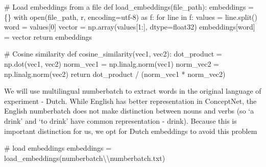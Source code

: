 \documentclass[
  letterpaper,
  DIV=11,
  numbers=noendperiod]{scrreprt}
\newenvironment{Shaded}{\begin{snugshade}}{\end{snugshade}}
\newcommand{\BuiltInTok}[1]{\textcolor[rgb]{0.00,0.23,0.31}{#1}}
\newcommand{\CharTok}[1]{\textcolor[rgb]{0.13,0.47,0.30}{#1}}
\newcommand{\CommentTok}[1]{\textcolor[rgb]{0.37,0.37,0.37}{#1}}
\newcommand{\ControlFlowTok}[1]{\textcolor[rgb]{0.00,0.23,0.31}{#1}}
\newcommand{\DecValTok}[1]{\textcolor[rgb]{0.68,0.00,0.00}{#1}}
\newcommand{\ImportTok}[1]{\textcolor[rgb]{0.00,0.46,0.62}{#1}}
\newcommand{\KeywordTok}[1]{\textcolor[rgb]{0.00,0.23,0.31}{#1}}
\newcommand{\NormalTok}[1]{\textcolor[rgb]{0.00,0.23,0.31}{#1}}
\newcommand{\OperatorTok}[1]{\textcolor[rgb]{0.37,0.37,0.37}{#1}}
\newcommand{\StringTok}[1]{\textcolor[rgb]{0.13,0.47,0.30}{#1}}
\begin{document}
\begin{Shaded}
\begin{Highlighting}[]
\CommentTok{\# Load embeddings from a file}
\KeywordTok{def}\NormalTok{ load\_embeddings(file\_path):}
\NormalTok{    embeddings }\OperatorTok{=}\NormalTok{ \{\}}
    \ControlFlowTok{with} \BuiltInTok{open}\NormalTok{(file\_path, }\StringTok{\textquotesingle{}r\textquotesingle{}}\NormalTok{, encoding}\OperatorTok{=}\StringTok{\textquotesingle{}utf{-}8\textquotesingle{}}\NormalTok{) }\ImportTok{as}\NormalTok{ f:}
        \ControlFlowTok{for}\NormalTok{ line }\KeywordTok{in}\NormalTok{ f:}
\NormalTok{            values }\OperatorTok{=}\NormalTok{ line.split()}
\NormalTok{            word }\OperatorTok{=}\NormalTok{ values[}\DecValTok{0}\NormalTok{]}
\NormalTok{            vector }\OperatorTok{=}\NormalTok{ np.array(values[}\DecValTok{1}\NormalTok{:], dtype}\OperatorTok{=}\StringTok{\textquotesingle{}float32\textquotesingle{}}\NormalTok{)}
\NormalTok{            embeddings[word] }\OperatorTok{=}\NormalTok{ vector}
    \ControlFlowTok{return}\NormalTok{ embeddings}

\CommentTok{\# Cosine similarity}
\KeywordTok{def}\NormalTok{ cosine\_similarity(vec1, vec2):}
\NormalTok{    dot\_product }\OperatorTok{=}\NormalTok{ np.dot(vec1, vec2)}
\NormalTok{    norm\_vec1 }\OperatorTok{=}\NormalTok{ np.linalg.norm(vec1)}
\NormalTok{    norm\_vec2 }\OperatorTok{=}\NormalTok{ np.linalg.norm(vec2)}
    \ControlFlowTok{return}\NormalTok{ dot\_product }\OperatorTok{/}\NormalTok{ (norm\_vec1 }\OperatorTok{*}\NormalTok{ norm\_vec2)}
\end{Highlighting}
\end{Shaded}

We will use multilingual numberbatch to extract words in the original
language of experiment - Dutch. While English has better representation
in ConceptNet, the English numberbatch does not make distinction between
nouns and verbs (so `a drink' and `to drink' have common representation
- drink). Because this is important distinction for us, we opt for Dutch
embeddings to avoid this problem

\begin{Shaded}
\begin{Highlighting}[]
\CommentTok{\# load embeddings}
\NormalTok{embeddings }\OperatorTok{=}\NormalTok{ load\_embeddings(}\StringTok{\textquotesingle{}numberbatch}\CharTok{\textbackslash{}\textbackslash{}}\StringTok{numberbatch.txt\textquotesingle{}}\NormalTok{)}
\end{Highlighting}
\end{Shaded}
\end{document}
